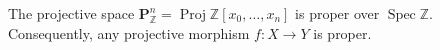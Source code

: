 The projective space $\mathbf{P}_{\mathbb{Z}}^n = \operatorname{Proj} \mathbb{Z}[x_0, \ldots, x_n]$ is proper over $\operatorname{Spec} \mathbb{Z}$. Consequently, any projective morphism $f: X \to Y$ is proper.
